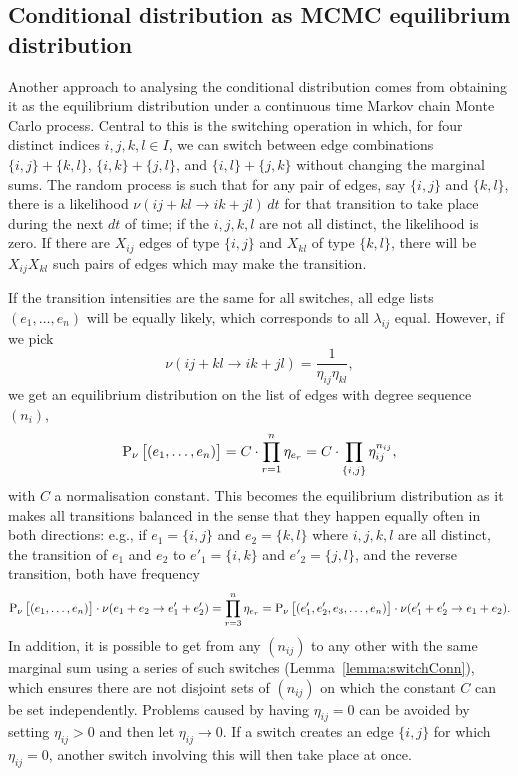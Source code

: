 \documentclass{myaptpub}%
\newcommand\Prob{\sP}
\newcommand\Prt[1]{\Prob_\nu\left[#1\right]}%
\newcommand\Transition[2]{\nu(#1\rightarrow#2)}
\newcommand\transition[2]{\Transition{\transPair#1:}{\transPair#2:}}
\def\transPair#1#2+#3#4:{#1#2+#3#4}
\begin{document}
\subsection{Conditional distribution as MCMC equilibrium distribution}

Another approach to analysing the conditional distribution comes from obtaining it as the equilibrium distribution under a continuous time Markov chain Monte Carlo process. Central to this is the switching operation in which, for four distinct indices $i,j,k,l\in I$, we can switch between edge combinations $\{i,j\}+\{k,l\}$, $\{i,k\}+\{j,l\}$, and $\{i,l\}+\{j,k\}$ without changing the marginal sums. The random process is such that for any pair of edges, say $\{i,j\}$ and $\{k,l\}$, there is a likelihood $\transition{ij+kl}{ik+jl}\,dt$ for that transition to take place during the next $dt$ of time; if the $i,j,k,l$ are not all distinct, the likelihood is zero. If there are $X_{ij}$ edges of type $\{i,j\}$ and $X_{kl}$ of type $\{k,l\}$, there will be $X_{ij}X_{kl}$ such pairs of edges which may make the transition.

If the transition intensities are the same for all switches, all edge lists $(e_1,\ldots,e_n)$ will be equally likely, which corresponds to all $\lambda_{ij}$ equal. However, if we pick
\begin{equation}\nonumber
\transition{ij+kl}{ik+jl}
=\frac{1}{\eta_{ij}\eta_{kl}},
\end{equation}
we get an equilibrium distribution on the list of edges with degree sequence $(n_i)$,
\begin{equation}\nonumber%
\Prt{\strut(e_1,\ldots,e_n)}=C\cdot\prod_{r=1}^n\eta_{e_r}=C\cdot\prod_{\{i,j\}} \eta_{ij}^{n_{ij}},
\end{equation}
with $C$ a normalisation constant.
This becomes the equilibrium distribution as it makes all transitions balanced in the sense that they happen equally often in both directions: e.g., if $e_1=\{i,j\}$ and $e_2=\{k,l\}$ where $i,j,k,l$ are all distinct, the transition of $e_1$ and $e_2$ to $e'_1=\{i,k\}$ and $e'_2=\{j,l\}$, and the reverse transition, both have frequency
\begin{equation}\nonumber
\Prt{\strut(e_1,\ldots,e_n)}\cdot\Transition{e_1+e_2}{e'_1+e'_2}
=\prod_{r=3}^n \eta_{e_r}
=\Prt{\strut(e'_1,e'_2,e_3,\ldots,e_n)}\cdot\Transition{e'_1+e'_2}{e_1+e_2}.
\end{equation}
In addition, it is possible to get from any $(n_{ij})$ to any other with the same marginal sum using a series of such switches (Lemma~\ref{lemma:switchConn}), which ensures there are not disjoint sets of $(n_{ij})$ on which the constant $C$ can be set independently. Problems caused by having $\eta_{ij}=0$ can be avoided by setting $\eta_{ij}>0$ and then let $\eta_{ij}\rightarrow0$. If a switch creates an edge $\{i,j\}$ for which $\eta_{ij}=0$, another switch involving this will then take place at once.
\end{document}
